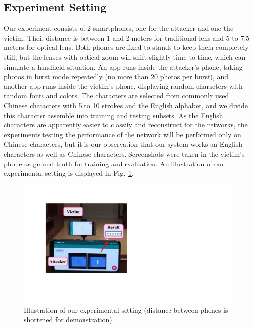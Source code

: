 \subsection{Experiment Setting}
\label{sec-experiment-setting}
Our experiment consists of 2 smartphones, one for the attacker and one the victim. Their distance is between 1 and 2 meters for traditional lens and 5 to 7.5 meters for optical lens. Both phones are fixed to stands to keep them completely still, but the lenses with optical zoom will shift slightly time to time, which can simulate a handheld situation. An app runs inside the attacker's phone, taking photos in burst mode repeatedly (no more than 20 photos per burst), and another app runs inside the victim's phone, displaying random characters with random fonts and colors. The characters are selected from commonly used Chinese characters with 5 to 10 strokes and the English alphabet, and we divide this character assemble into training and testing subsets. As the English characters are apparently easier to classify and reconstruct for the networks, the experiments testing the performance of the network will be performed only on Chinese characters, but it is our observation that our system works on English characters as well as Chinese characters. Screenshots were taken in the victim's phone as ground truth for training and evaluation. An illustration of our experimental setting is displayed in Fig.~\ref{illustration_of_system}.
\begin{figure}
	\centering
	\includegraphics[width=0.80\linewidth]{pic/setup.pdf}
    \caption{Illustration of our experimental setting (distance between phones is shortened for demonstration).}
	\label{illustration_of_system}
\end{figure}

